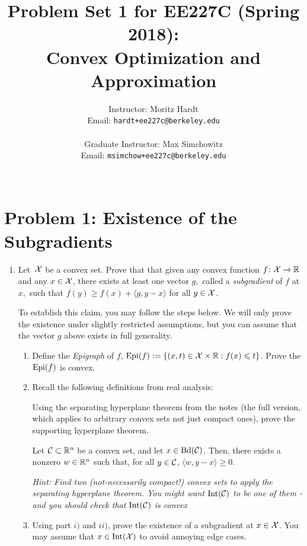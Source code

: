 \documentclass[12pt]{article}
\title{Problem Set 1 for EE227C (Spring 2018):\\
 Convex Optimization and Approximation }
\author{Instructor: Moritz Hardt\\
{\small Email: \tt hardt+ee227c@berkeley.edu}\\ ~\\
Graduate Instructor: Max Simchowitz\\
{\small Email: \tt msimchow+ee227c@berkeley.edu}\\ ~\\
}
\begin{document}


\maketitle

\section*{Problem 1: Existence of the Subgradients}
\begin{enumerate}
\item
Let~${\cal X}$ be a convex set. Prove that that given any convex function $f\colon{\cal X} \to
\mathbb{R}$ and any $x \in {\cal X}$, there exists at least one vector $g,$ called a
\emph{subgradient} of $f$ at $x,$ such that $f(y) \ge f(x) + \langle g, y - x
\rangle$ for all $y \in {\cal X}$. 


To establish this claim, you may follow the steps below. 
We will only prove the existence under slightly restricted assumptions, but you can assume that the vector $g$ above exists in full generality. 

\begin{enumerate}
\item
Define the \emph{Epigraph} of $f$, $\mathrm{Epi}(f) := \{(x,t) \in {\cal X}
\times \mathbb{R}: f(x) \leqslant t\}$. Prove the $\mathrm{Epi}(f)$ is convex. 
\item
Recall the following definitions from real analysis:
%
\begin{definition*} 
\end{definition*}

Using the separating hyperplane theorem from the notes (the full version, which applies to arbitrary convex sets not just compact ones), prove the supporting hyperplane theorem.
\begin{theorem*} Let ${\cal C} \subset \mathbb{R}^n$ be a convex set,
and let $x \in \mathrm{Bd}({\cal C})$. Then, there exists a nonzero $w \in \mathbb{R}^n$ such that, for all $y \in {\cal C}$, $\langle w, y - x \rangle \ge 0$. 
\end{theorem*}
\emph{Hint:  Find two (not-necessarily compact!) convex sets to apply the separating hyperplane theorem. You might want $\mathrm{Int}({\cal C})$ to be one of them - and you should check that $\mathrm{Int}({\cal C})$ is convex } 

\item
Using part $i)$ and $ii)$, prove the existence of a subgradient at $x \in {\cal X}$. You may assume that $x \in \mathrm{Int}({\cal X})$ to avoid annoying edge cases.
\end{enumerate}


\end{enumerate}
\end{document}
